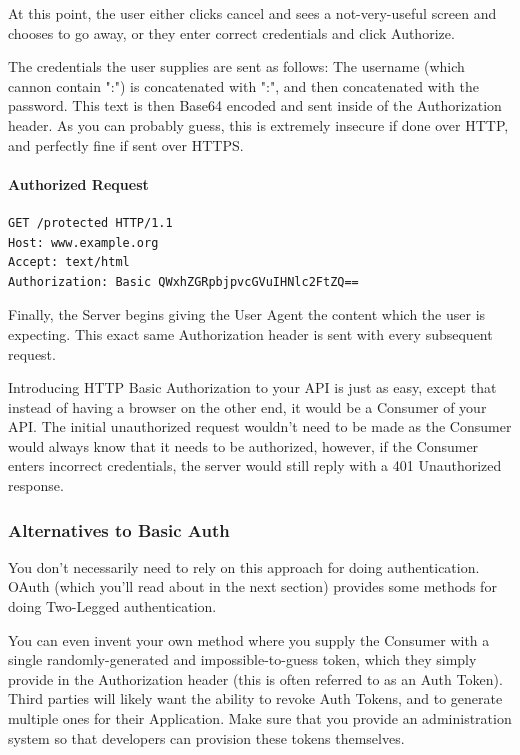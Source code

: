 \documentclass{book}
\begin{document}
At this point, the user either clicks cancel and sees a not-very-useful screen and chooses to go away, or they enter correct credentials and click Authorize.

The credentials the user supplies are sent as follows: The username (which cannon contain ":") is concatenated with ":", and then concatenated with the password. This text is then Base64 encoded and sent inside of the Authorization header. As you can probably guess, this is extremely insecure if done over HTTP, and perfectly fine if sent over HTTPS.

\paragraph{\textbf{Authorized Request}}

\begin{verbatim}
GET /protected HTTP/1.1
Host: www.example.org
Accept: text/html
Authorization: Basic QWxhZGRpbjpvcGVuIHNlc2FtZQ==
\end{verbatim}

Finally, the Server begins giving the User Agent the content which the user is expecting. This exact same Authorization header is sent with every subsequent request.

Introducing HTTP Basic Authorization to your API is just as easy, except that instead of having a browser on the other end, it would be a Consumer of your API. The initial unauthorized request wouldn't need to be made as the Consumer would always know that it needs to be authorized, however, if the Consumer enters incorrect credentials, the server would still reply with a 401 Unauthorized response.

\subsubsection{Alternatives to Basic Auth}

You don't necessarily need to rely on this approach for doing authentication. OAuth (which you'll read about in the next section) provides some methods for doing Two-Legged authentication.

You can even invent your own method where you supply the Consumer with a single randomly-generated and impossible-to-guess token, which they simply provide in the Authorization header (this is often referred to as an Auth Token). Third parties will likely want the ability to revoke Auth Tokens, and to generate multiple ones for their Application. Make sure that you provide an administration system so that developers can provision these tokens themselves.
\end{document}
